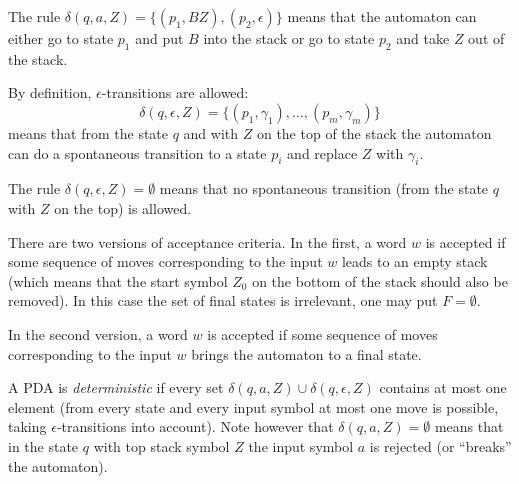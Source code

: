 \begin{page}
\setcounter{section}{6}
\setcounter{subsection}{1}
\setcounter{dfn}{2}
\label{portion:1114}

\begin{exl}
The rule $\delta(q, a, Z) = \{(p_1, BZ), (p_2, \epsilon)\}$ means that the automaton can either go to state $p_1$ and put $B$ into the stack
or go to state $p_2$ and take $Z$ out of the stack.
\end{exl}

\end{page}

\begin{page}
\setcounter{section}{6}
\setcounter{subsection}{1}
\setcounter{dfn}{2}
\label{portion:1115}


By definition, $\epsilon$-transitions are allowed:
\[
\delta(q, \epsilon, Z) = \{(p_1, \gamma_1), \ldots, (p_m, \gamma_m)\}
\]
means that from the state $q$ and with $Z$ on the top of the stack the automaton can do a spontaneous transition
to a state $p_i$ and replace $Z$ with $\gamma_i$.


\end{page}

\begin{page}
\setcounter{section}{6}
\setcounter{subsection}{1}
\setcounter{dfn}{3}
\label{portion:1117}

\begin{exl}
The rule $\delta(q, \epsilon, Z) = \emptyset$ means that no spontaneous transition (from the state $q$ with $Z$ on the top) is allowed.
\end{exl}

\end{page}

\begin{page}
\setcounter{section}{6}
\setcounter{subsection}{1}
\setcounter{dfn}{3}
\label{portion:1118}


There are two versions of acceptance criteria.
In the first, a word $w$ is accepted if some sequence of moves corresponding to the input $w$ leads to an empty stack
(which means that the start symbol $Z_0$ on the bottom of the stack should also be removed).
In this case the set of final states is irrelevant, one may put $F = \emptyset$.

In the second version, a word $w$ is accepted if some sequence of moves corresponding to the input $w$ brings the automaton to a final state.

A PDA is \emph{deterministic} if every set $\delta(q, a, Z) \cup \delta(q, \epsilon, Z)$ contains at most one element
(from every state and every input symbol at most one move is possible, taking $\epsilon$-transitions into account).
Note however that $\delta(q, a, Z) = \emptyset$ means that in the state $q$ with top stack symbol $Z$
the input symbol $a$ is rejected (or ``breaks'' the automaton).


\end{page}


